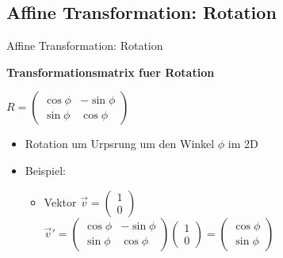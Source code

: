 \documentclass[10pt,aspectratio=169]{beamer}
\begin{document}
  \subsection{Affine Transformation: Rotation}
  \begin{frame}{Affine Transformation: Rotation}
      \begin{minipage}{9cm}
        \textbf{Transformationsmatrix fuer Rotation}
        \begin{center}
          $R = \begin{pmatrix}
            \cos\phi & -\sin\phi\\
            \sin\phi & \cos\phi
          \end{pmatrix}$
          \begin{itemize}
            \item Rotation um Urpsrung um den Winkel $\phi$ im 2D
            \item Beispiel:
            \begin{itemize}
              \item Vektor $\vec{v} = \begin{pmatrix}
                1\\0
              \end{pmatrix}$\\\vspace{0.1cm}
                $\vec{v}' = \begin{pmatrix}
                  \cos\phi & -\sin\phi\\
                  \sin\phi & \cos\phi
                \end{pmatrix}\begin{pmatrix}
                  1\\0
                \end{pmatrix} = \begin{pmatrix}
                  \cos\phi\\\sin\phi
                \end{pmatrix}$  
            \end{itemize}
          \end{itemize}
        \end{center}
      \end{minipage}
      \begin{minipage}{4cm}

\end{minipage}
\end{frame}
\end{document}
